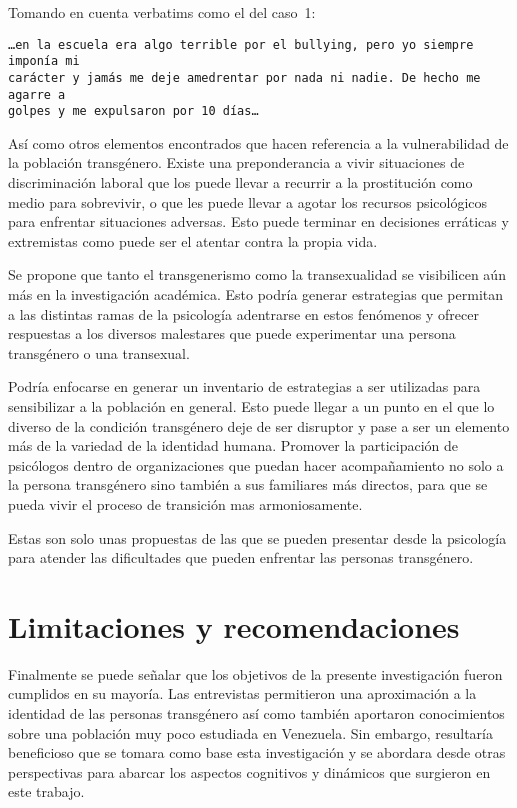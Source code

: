 Tomando en cuenta verbatims como el del caso~1:

\begin{verbatim}
…en la escuela era algo terrible por el bullying, pero yo siempre imponía mi
carácter y jamás me deje amedrentar por nada ni nadie. De hecho me agarre a
golpes y me expulsaron por 10 días…
\end{verbatim}

Así como otros elementos encontrados que hacen referencia a la vulnerabilidad de
la población transgénero. Existe una preponderancia a vivir situaciones de
discriminación laboral que los puede llevar a recurrir a la prostitución como
medio para sobrevivir, o que les puede llevar a agotar los recursos psicológicos
para enfrentar situaciones adversas. Esto puede terminar en decisiones erráticas
y extremistas como puede ser el atentar contra la propia vida.

Se propone que tanto el transgenerismo como la transexualidad se
visibilicen aún más en la investigación académica. Esto podría
generar estrategias que permitan a las distintas ramas de la
psicología adentrarse en estos fenómenos y ofrecer respuestas a
los diversos malestares que puede experimentar una persona
transgénero o una transexual.

Podría enfocarse en generar un inventario de estrategias a ser utilizadas para
sensibilizar a la población en general. Esto puede llegar a un punto en el que
lo diverso de la condición transgénero deje de ser disruptor y pase a ser un
elemento más de la variedad de la identidad humana. Promover la participación de
psicólogos dentro de organizaciones que puedan hacer acompañamiento no solo a la
persona transgénero sino también a sus familiares más directos, para que se
pueda vivir el proceso de transición mas armoniosamente.

Estas son solo unas propuestas de las que se pueden presentar desde la
psicología para atender las dificultades que pueden enfrentar
las personas transgénero.

\section{Limitaciones y recomendaciones}

Finalmente se puede señalar que los objetivos de la presente investigación
fueron cumplidos en su mayoría. Las entrevistas permitieron una aproximación a
la identidad de las personas transgénero así como también aportaron
conocimientos sobre una población muy poco estudiada en Venezuela. Sin embargo,
resultaría beneficioso que se tomara como base esta investigación y se abordara
desde otras perspectivas para abarcar los aspectos cognitivos y dinámicos que
surgieron en este trabajo.

